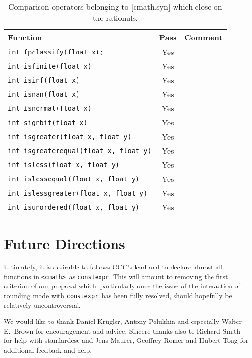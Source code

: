 \documentclass[prd,twocolumn,amsmath,amssymb,nofootinbib,eqsecnum]{revtex4-1}
\newcommand{\constexpr}{\code{constexpr}\xspace}
\newcommand{\code}[1]{{\tt #1}}
\newcommand{\header}[1]{{\tt <#1>}}
\newcommand{\cmath}{\header{cmath}}
\begin{document}
\begin{table}
	\begin{tabular}{lcc}
		Function & Pass & Comment
	\\
	\hline \hline
		\code{int fpclassify(float x);} & Yes &
	\\
	\hline
		\code{int isfinite(float x)} & Yes &
	\\
	\hline
		\code{int isinf(float x)} & Yes &
	\\
	\hline
		\code{int isnan(float x)} & Yes &
	\\
	\hline
		\code{int isnormal(float x)} & Yes &
	\\
	\hline
		\code{int signbit(float x)} & Yes &
	\\
	\hline
		\code{int isgreater(float x, float y)} & Yes &
	\\
	\hline
		\code{int isgreaterequal(float x, float y)} & Yes &
	\\
	\hline
		\code{int isless(float x, float y)} & Yes &
	\\
	\hline
		\code{int islessequal(float x, float y)} & Yes &
	\\
	\hline
		\code{int islessgreater(float x, float y)} & Yes &
	\\
	\hline
		\code{int isunordered(float x, float y)} & Yes &
	\end{tabular}
\caption{Comparison operators belonging to [cmath.syn] which close on the rationals.}
\label{tab:26.9.4}
\end{table}

\section{Future Directions}

Ultimately, it is desirable to follows GCC's lead and to declare almost all functions in \cmath\ as \constexpr. This will amount to removing the first criterion of our proposal which, particularly once the issue of the interaction of rounding mode with \constexpr\ has been fully resolved, should hopefully be relatively uncontroversial.

\begin{acknowledgments}
	We would like to thank Daniel Kr\"ugler, Antony Polukhin and especially Walter E.~Brown 
	for encouragement and advice. Sincere thanks also to Richard Smith for help with standardese
	and Jens Maurer, Geoffrey Romer and Hubert Tong for additional feedback and help.
\end{acknowledgments}
\end{document}
